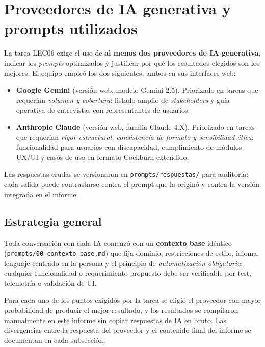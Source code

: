 \section{Proveedores de IA generativa y prompts utilizados}
\label{sec:prompts}

La tarea LEC06 exige el uso de \textbf{al menos dos proveedores de IA
generativa}, indicar los \textit{prompts} optimizados y justificar por
qué los resultados elegidos son los mejores. El equipo empleó los dos
siguientes, ambos en sus interfaces web:

\begin{itemize}
  \item \textbf{Google Gemini} (versión web, modelo Gemini 2.5).
        Priorizado en tareas que requerían \emph{volumen y cobertura}:
        listado amplio de \textit{stakeholders} y guía operativa de
        entrevistas con representantes de usuarios.
  \item \textbf{Anthropic Claude} (versión web, familia Claude 4.X).
        Priorizado en tareas que requerían \emph{rigor estructural,
        consistencia de formato y sensibilidad ética}: funcionalidad
        para usuarios con discapacidad, cumplimiento de módulos UX/UI
        y casos de uso en formato Cockburn extendido.
\end{itemize}

Las respuestas crudas se versionaron en
\texttt{prompts/respuestas/} para auditoría: cada salida puede
contrastarse contra el prompt que la originó y contra la versión
integrada en el informe.

\subsection{Estrategia general}

Toda conversación con cada IA comenzó con un \textbf{contexto base}
idéntico (\texttt{prompts/00\_contexto\_base.md}) que fija dominio,
restricciones de estilo, idioma, lenguaje centrado en la persona y el
principio de \emph{automatización obligatoria}: cualquier
funcionalidad o requerimiento propuesto debe ser verificable por test,
telemetría o validación de UI.

Para cada uno de los puntos exigidos por la tarea se eligió el
proveedor con mayor probabilidad de producir el mejor resultado, y los
resultados se compilaron manualmente en este informe sin copiar
respuestas de IA en bruto. Las divergencias entre la respuesta del
proveedor y el contenido final del informe se documentan en cada
subsección.


